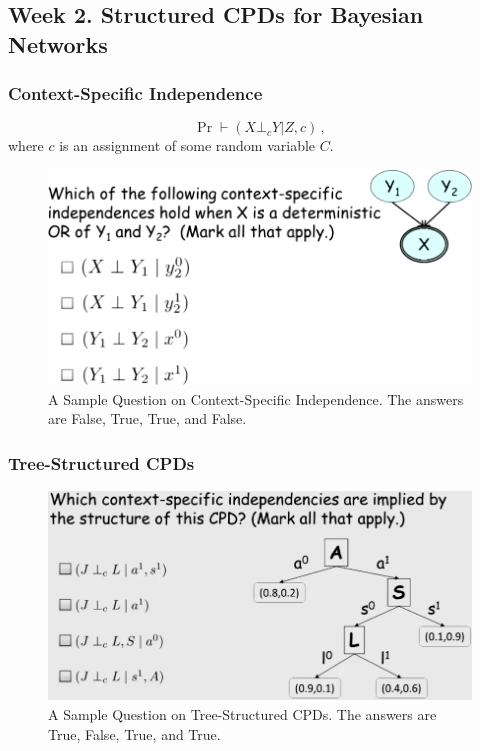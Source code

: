 \documentclass[12pt]{article}
\begin{document}
\subsection{Week 2. Structured CPDs for Bayesian Networks}

\subsubsection{Context-Specific Independence}
\begin{equation*}
  \Pr \vdash (X \bot_c Y | Z, c) \, ,
\end{equation*}
where $c$ is an assignment of some random variable $C$.

\begin{figure}[H]
\centering
\includegraphics[width=5.5in]{graphics/example_context_specific_independence.png}
\caption{A Sample Question on Context-Specific Independence.  The answers are False, True, True, and False.}
\label{fig:example_context_specific_independence}
\end{figure}

\subsubsection{Tree-Structured CPDs}

\begin{figure}[H]
\centering
\includegraphics[width=6in]{graphics/example_tree_structured_cpds.png}
\caption{A Sample Question on Tree-Structured CPDs.  The answers are True, False, True, and True.}
\label{fig:example_tree_structured_cpds}
\end{figure}
\end{document}
